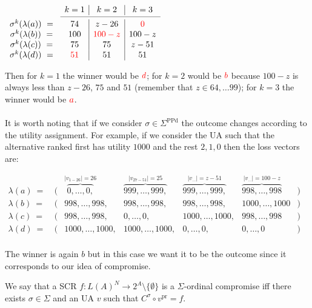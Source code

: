 \documentclass[version=3.21, pagesize, notitlepage, twoside=off, bibliography=totoc, DIV=calc, fontsize=12pt, a4paper]{scrartcl}
\newcommand{\SPPd}{\Sigma^\text{PPd}}
\newcommand{\vpr}{v^\text{pr}}
\begin{document}
\begin{example}
	\begin{center}
		$
		\begin{array}{cc|c|c}
		& k=1 & k=2 & k=3 \\ \cmidrule{2-4}
		\sigma^k (\lambda (a))\ = \ & 74 & z-26 & {\color{red}0} \\
		\sigma^k (\lambda (b))\ = \ & 100 & {\color{red}100-z} & 100-z \\
		\sigma^k (\lambda (c))\ = \ & 75 & 75 & z-51 \\
		\sigma^k (\lambda (d))\ = \ & {\color{red}51} & 51 & 51 \\
		\end{array}
		$
	\end{center}	
	
	Then for $k=1$ the winner would be $\color{red}d$; for $k=2$ would be $\color{red}b$ because $100-z$ is always less than $z-26$, $75$ and $51$ (remember that $z \in {64, \dots 99}$); for $k=3$ the winner would be $\color{red}a$.
	\\\\
	It is worth noting that if we consider $\sigma \in \SPPd$ the outcome changes according to the utility assignment. For example, if we consider the UA such that the alternative ranked first has utility $1000$ and the rest $2,1,0$ then the loss vectors are: 
	\begin{center}
		$
		\begin{array}{ccccccc}
		\lambda(a)\ = \ &(& \overbrace{0, \dots,0,}^{|v_{1-26}|=26} & \overbrace{999, \dots, 999,}^{|v_{27-51}|=25} & \overbrace{999, \dots, 999,}^{|v_{\dots}|=z-51} & \overbrace{998, \dots, 998}^{|v_{\dots}|=100-z} &) \\
		\lambda(b)\ = \ &(& 998, \dots,998, & 998, \dots, 998, & 998, \dots, 998, & 1000, \dots, 1000 &) \\
		\lambda(c)\ = \ &(& 998, \dots,998, & 0, \dots, 0, & 1000, \dots, 1000, & 998, \dots, 998 &) \\
		\lambda(d)\ = \ &(& 1000, \dots,1000, & 1000, \dots, 1000, & 0, \dots, 0, & 0, \dots, 0 &) \\
		\end{array}
		$
	\end{center}
	The winner is again $b$ but in this case we want it to be the outcome since it corresponds to our idea of compromise.
\end{example}



\begin{definition}
\label{D1} \bigskip We say that a SCR $f:L(A)^{N}\rightarrow 2^{A} \setminus \{\emptyset \}$ is a $\Sigma$-ordinal compromise iff there exists $\sigma \in \Sigma $ and an UA $v$ such that $C^{\sigma }\circ \vpr=f$.
\end{definition}
\end{document}
